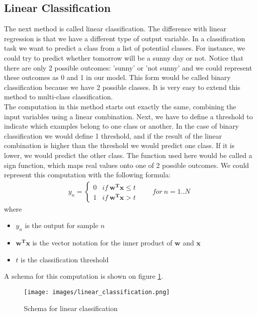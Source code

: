 \subsection{Linear Classification}
The next method is called linear classification\cite{caltechmachinelearning}\cite{wikiclassification}. The difference with linear regression is that we have a different type of output variable. In a classification task we want to predict a class from a list of potential classes. For instance, we could try to predict whether tomorrow will be a sunny day or not. Notice that there are only 2 possible outcomes: 'sunny' or 'not sunny' and we could represent these outcomes as 0 and 1 in our model. This form would be called binary classification because we have 2 possible classes. It is very easy to extend this method to multi-class classification.\\
The computation in this method starts out exactly the same, combining the input variables using a linear combination. Next, we have to define a threshold to indicate which examples belong to one class or another. In the case of binary classification we would define 1 threshold, and if the result of the linear combination is higher than the threshold we would predict one class. If it is lower, we would predict the other class. The function used here would be called a sign function, which maps real values onto one of 2 possible outcomes. We could represent this computation with the following formula: 
\begin{equation}
\begin{split}
y_{n} =
\begin{cases} 
0 & if\ \bm{w^{T}x} \leq t \\
1 & if\ \bm{w^{T}x} > t 
\end{cases}
\qquad for\ n=1..N
\end{split}
\end{equation}
where
\begin{itemize}
	\item $y_{n}$ is the output for sample $n$
	\item $\bm{w^{T}x}$ is the vector notation for the inner product of $\bm{w}$ and $\bm{x}$
	\item $t$ is the classification threshold
\end{itemize}
A schema for this computation is shown on figure \ref{fig:glm-linear-classification}.
\begin{figure}
	\centering
	\texttt{[image: images/linear\_classification.png]}
	\caption{Schema for linear classification}
	\label{fig:glm-linear-classification}
\end{figure}
